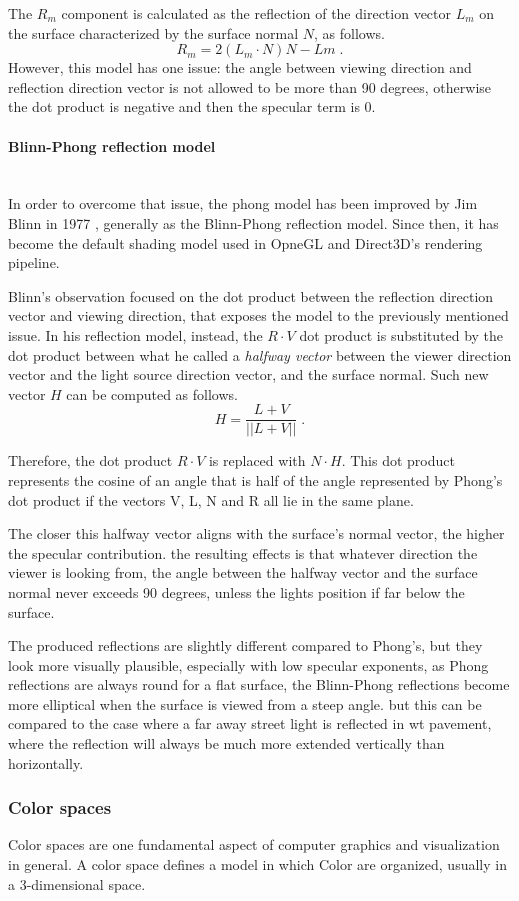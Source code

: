\documentclass[12pt,a4paper]{extarticle}
\newcommand{\linespace}{\vspace{0pt}}
\newcommand{\myparagraph}[1]{\paragraph{#1}\mbox{}\\}
\begin{document}
The $R_{m}$ component is calculated as the reflection of the direction vector $L_{m}$ on the surface characterized by the surface normal $N$, as follows.
\[
R_{m} = 2(L_{m} \cdot N)N - L{m} \;.
\]
However, this model has one issue: the angle between viewing direction and reflection direction vector  is not allowed to be more than 90 degrees, otherwise the dot product is negative and then the specular term is 0.
\myparagraph{Blinn-Phong reflection model}
In order to overcome that issue, the phong model has been improved by Jim Blinn in 1977 \cite{blinn1977models}, generally as the Blinn-Phong reflection model. Since then, it has become the default shading model used in OpneGL and Direct3D's rendering pipeline. %


Blinn's observation focused on the dot product between the reflection direction vector and viewing direction, that exposes the model to the previously mentioned issue. In his reflection model, instead, the $R \cdot V$ dot product is substituted by the dot product between what he called a \textit{halfway vector} between the viewer direction vector and the light source direction vector, and the surface normal. Such new vector $H$ can be computed as follows.%
\[
H = \frac{L + V}{||L+V||} \;.
\]

Therefore, the dot product $R \cdot V$ is replaced with $N \cdot H$.
This dot product represents the cosine of an angle that is half of the angle represented by Phong's dot product if the vectors V, L, N and R all lie in the same plane.

The closer this halfway vector aligns with the surface's normal vector, the higher the specular contribution. the resulting effects is that whatever direction the viewer is looking from, the angle between the halfway vector and the surface normal never exceeds 90 degrees, unless the lights position if far below the surface.
\linespace

The produced reflections are slightly different compared to Phong's, but they look more visually plausible, especially with low specular exponents, as Phong reflections are always round for a flat surface, the Blinn-Phong reflections become more elliptical when the surface is viewed from a steep angle. but this can be compared to the case where a far away street light is reflected in wt pavement, where the reflection will always be much more extended vertically than horizontally.


\subsubsection{Color spaces} %
Color spaces are one fundamental aspect of computer graphics and visualization in general. A color space defines a model in which Color are organized, usually in a 3-dimensional space.
\linespace
\end{document}

